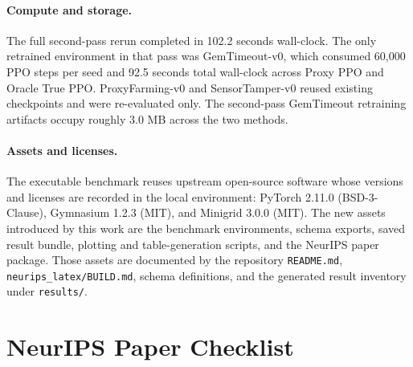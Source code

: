 \documentclass{article}
\begin{document}
\paragraph{Compute and storage.}
The full second-pass rerun completed in 102.2 seconds wall-clock. The only
retrained environment in that pass was GemTimeout-v0, which consumed 60,000 PPO
steps per seed and 92.5 seconds total wall-clock across Proxy PPO and Oracle
True PPO. ProxyFarming-v0 and SensorTamper-v0 reused existing checkpoints and
were re-evaluated only. The second-pass GemTimeout retraining artifacts occupy
roughly 3.0 MB across the two methods.

\paragraph{Assets and licenses.}
The executable benchmark reuses upstream open-source software whose versions and
licenses are recorded in the local environment: PyTorch 2.11.0
(BSD-3-Clause), Gymnasium 1.2.3 (MIT), and Minigrid 3.0.0 (MIT). The new assets
introduced by this work are the benchmark environments, schema exports, saved
result bundle, plotting and table-generation scripts, and the NeurIPS paper
package. Those assets are documented by the repository \texttt{README.md},
\texttt{neurips\_latex/BUILD.md}, schema definitions, and the generated result
inventory under \texttt{results/}.
\section*{NeurIPS Paper Checklist}
\end{document}
